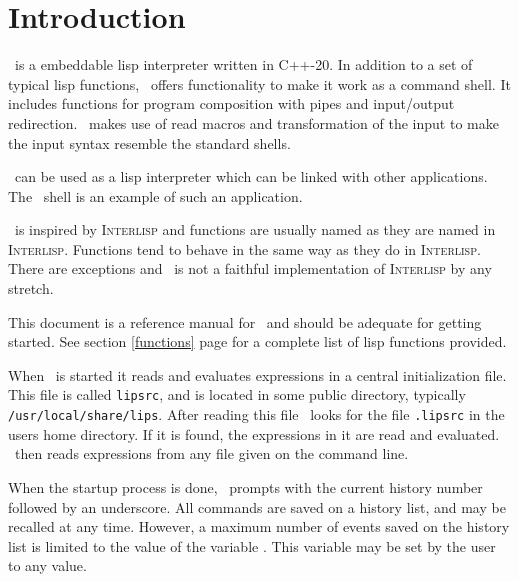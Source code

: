 %
%
%
%
%
\section{Introduction}
\lips\ is a embeddable lisp interpreter written in \textsf{C++-20}.
In addition to a set of typical lisp functions, \lips\ offers
functionality to make it work as a command shell.  It includes
functions for program composition with pipes and input/output
redirection.  \lips\ makes use of read macros and transformation of
the input to make the input syntax resemble the standard shells.

\lips\ can be used as a lisp interpreter which can be linked with
other applications.  The \lips\ shell is an example of such an
application.

\lips\ is inspired by \textsc{Interlisp} and functions are usually
named as they are named in \textsc{Interlisp}.  Functions tend to
behave in the same way as they do in \textsc{Interlisp}.  There are
exceptions and \lips\ is not a faithful implementation of
\textsc{Interlisp} by any stretch.

This document is a reference manual for \lips\ and should be adequate
for getting started.  See section \ref{functions} page
\pageref{functions} for a complete list of lisp functions provided.

When \lips\ is started it reads and evaluates expressions in a central
initialization file.  This file is called \texttt{lipsrc}, and is
located in some public directory, typically
\texttt{/usr/local/share/lips}.  After reading this file \lips\ looks
for the file \texttt{.lipsrc} in the users home directory.  If it is
found, the expressions in it are read and evaluated. \lips\ then reads
expressions from any file given on the command line.

When the startup process is done, \lips\ prompts with the current
history number followed by an underscore.  All commands are saved on a
history list, and may be recalled at any time.  However, a maximum
number of events saved on the history list is limited to the value of
the variable .  This variable may be set by the user to
any value.
